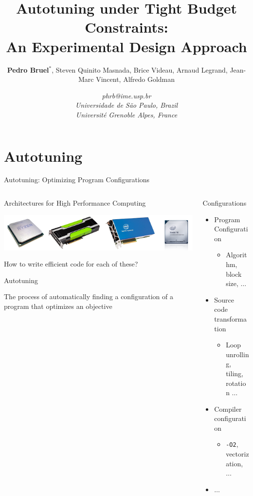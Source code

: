 \documentclass[10pt, compress, aspectratio=169, xcolor={table,usenames,dvipsnames}]{beamer}
\author{ \footnotesize \textbf{\alert{Pedro Bruel$^{*}$}},  Steven Quinito Masnada, Brice Videau, Arnaud Legrand, Jean-Marc Vincent, Alfredo Goldman}
\date{ \scriptsize \textit{phrb@ime.usp.br} \\[1em] \textit{Universidade de São Paulo, Brazil} \\ \textit{Université Grenoble Alpes, France}}
\title{Autotuning under Tight Budget Constraints:  \\ An Experimental Design Approach}
\begin{document}
\maketitle

\section{Autotuning}
\label{sec:orgd9e8cb2}
\begin{frame}[label={sec:org42c2b6f},fragile]{Autotuning: Optimizing Program Configurations}
 \begin{columns}
\begin{column}{0.5\columnwidth}
\begin{block}{Architectures for High Performance Computing}
\begin{center}
\includegraphics[width=.9\linewidth]{../../../img/architectures.png}
\end{center}

How to write \alert{efficient code} for each of these?

\begin{block}{Autotuning}
\vspace{.2cm}

The process of automatically finding a \alert{configuration} of a program that
optimizes an \alert{objective}
\end{block}
\end{block}
\end{column}

\begin{column}{0.5\columnwidth}
\begin{block}{Configurations}
\begin{itemize}
\item Program Configuration
\begin{itemize}
\item Algorithm, block size, \(\dots\)
\end{itemize}
\item Source code transformation
\begin{itemize}
\item Loop unrolling, tiling, rotation \(\dots\)
\end{itemize}
\item Compiler configuration
\begin{itemize}
\item \texttt{-O2}, vectorization, \(\dots\)
\end{itemize}
\item \(\dots\)


\end{itemize}
\end{block}
\end{column}
\end{columns}
\end{frame}
\end{document}
